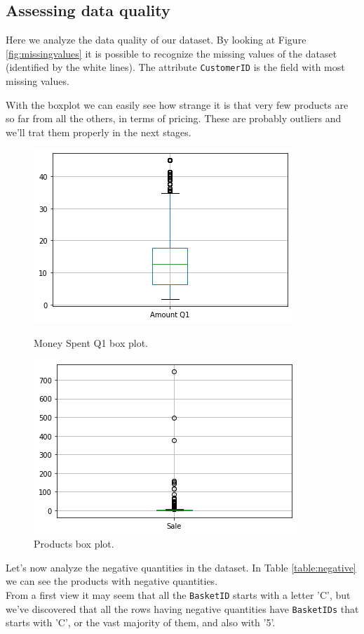 \documentclass[12pt]{article}
\begin{document}
\subsection{Assessing data quality}
Here we analyze the data quality of our dataset. By looking at Figure \ref{fig:missingvalues} it is possible to recognize the missing values of the dataset (identified by the white lines). The attribute \texttt{CustomerID} is the field with most missing values.

With the boxplot we can easily see how strange it is that very few products are so far from all the others, in terms of pricing. These are probably outliers and we'll trat them properly in the next stages.

\begin{figure}[!h]
\centering
  \includegraphics[scale=0.5]{images/boxplotq1outliers.png}
      \caption{Money Spent Q1 box plot.}
  \label{fig:boxplotq1outliers}
\endminipage\hfill
{}
\centering
    \includegraphics[scale=0.5]{images/productsboxplot.png}
    \caption{Products box plot.}
    \label{fig:productsbox}
\endminipage\hfill
\end{figure}

Let's now analyze the negative quantities in the dataset. In Table \ref{table:negative} we can see the products with negative quantities.\\ From a first view it may seem that all the \texttt{BasketID} starts with a letter 'C', but we've discovered that all the rows having negative quantities have \texttt{BasketIDs} that starts with 'C', or the vast majority of them, and also with '5'.
\end{document}
